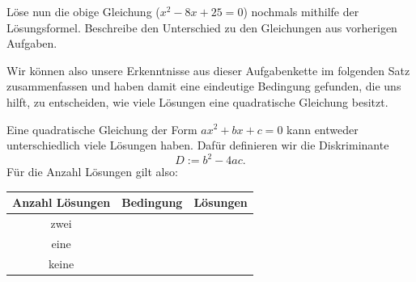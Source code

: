 \documentclass[11pt,oneside]{article}
\begin{document}
	\begin{aufgabe}
		Löse nun die obige Gleichung ($x^2-8x+25=0$) nochmals mithilfe der Lösungsformel. Beschreibe den Unterschied zu den Gleichungen aus vorherigen Aufgaben.\vspace{5pt}\newline{}
	\end{aufgabe}
	Wir können also unsere Erkenntnisse aus dieser Aufgabenkette im folgenden Satz zusammenfassen und haben damit eine eindeutige Bedingung gefunden, die uns hilft, zu entscheiden, wie viele Lösungen eine quadratische Gleichung besitzt.
	\begin{satz}
		Eine quadratische Gleichung der Form $ax^2+bx+c=0$ kann entweder unterschiedlich viele Lösungen haben. Dafür definieren wir die Diskriminante \[D:=b^2-4ac.\] Für die Anzahl Lösungen gilt also:
		\begingroup
		\renewcommand{\arraystretch}{1.5}
		\begin{table}[H]
			\centering
			\begin{tabular}{c|p{4cm}|p{6cm}}
				Anzahl Lösungen & Bedingung & Lösungen \\\hline
				zwei &  &  \\\hline
				eine &  &  \\\hline
				keine &  &  \\
			\end{tabular}
		\end{table}
		\endgroup
	\end{satz}
\end{document}
